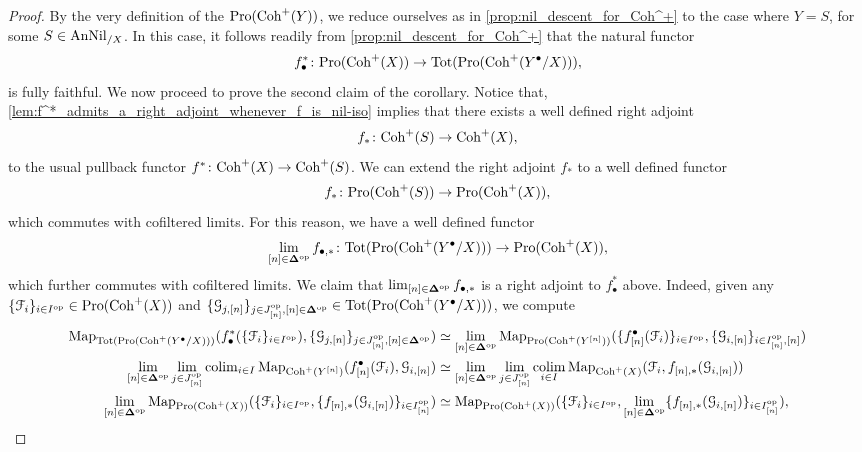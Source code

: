 \documentclass[10pt,a4paper,reqno]{amsart} %
\theoremstyle{plain}
\theoremstyle{definition}
\theoremstyle{remark}
\numberwithin{equation}{section}
\begin{document}
\begin{proof}
    By the very definition of the \infcat $\mathrm{Pro}(\mathrm{Coh}^+(Y))$, we reduce ourselves as in
    \cref{prop:nil_descent_for_Coh^+} to the case where $Y = S$, for some $S \in \mathrm{AnNil}_{/X}$. In this case, it follows readily from
    \cref{prop:nil_descent_for_Coh^+} that the natural functor
        \[
            f_\bullet^* \colon \mathrm{Pro}(\mathrm{Coh}^+(X)) \to \mathrm{Tot}(\mathrm{Pro}(\mathrm{Coh}^+(Y^\bullet/X))),  
        \]
    is fully faithful. We now proceed to prove the second claim of the corollary. Notice that,
    \cref{lem:f^*_admits_a_right_adjoint_whenever_f_is_nil-iso} implies that there exists a well defined right adjoint
        \[
            f_* \colon \mathrm{Coh}^+(S) \to \mathrm{Coh}^+(X),  
        \]
    to the usual pullback functor $f^* \colon \mathrm{Coh}^+(X) \to \mathrm{Coh}^+(S)$. We can extend the right adjoint $f_*$ to a well defined functor
        \[
            f_* \colon \mathrm{Pro}(\mathrm{Coh}^+(S)) \to \mathrm{Pro}(\mathrm{Coh}^+(X)),  
        \]
    which commutes with cofiltered limits. For this reason, we have a well defined functor
        \[
            \lim_{[n] \in \bm{\Delta} ^\mathrm{op}} f_{\bullet, *} \colon \mathrm{Tot}(\mathrm{Pro}(\mathrm{Coh}^+(Y^\bullet/X))) \to \mathrm{Pro}(\mathrm{Coh}^+(X)),  
        \]
    which further commutes with cofiltered limits. We claim that $\lim_{[n] \in \bm{\Delta} ^\mathrm{op}} f_{\bullet, *}$ is a right adjoint to $f_\bullet^*$ above. Indeed, given
    any $\{ \mathcal F_i \}_{i \in I^\mathrm{op}}  \in \mathrm{Pro}(\mathrm{Coh}^+(X))$ and $\{ \mathcal G_{j, [n]} \}_{j \in J_{[n]} ^\mathrm{op}, [n] \in \bm{\Delta} ^\mathrm{op}} \in \mathrm{Tot}(\mathrm{Pro}(\mathrm{Coh}^+(Y^\bullet/X)))$,
    we compute
        \begin{align*}
            \operatorname{Map}_{\mathrm{Tot}(\mathrm{Pro}(\mathrm{Coh}^+(Y^\bullet/X)))}( f_\bullet^*( \{ \mathcal F_i \}_{i \in I^\mathrm{op}}), \{ \mathcal G_{j, [n]} \}_{j \in J^\mathrm{op}_{[n]}, [n] \in \bm{\Delta} ^\mathrm{op}}) & \simeq \lim_{[n] \in \bm{\Delta} ^\mathrm{op}} \operatorname{Map}_{\mathrm{Pro}(\mathrm{Coh}^+(Y^{[n]}))} ( \{f_{[n]}^\bullet(\mathcal F_i) \}_{i \in I^\mathrm{op}},  \{ \mathcal G_{i, [n]} \}_{i \in I^\mathrm{op}_{[n]}, [n]}) \\
            \lim_{[n] \in \bm{\Delta} ^\mathrm{op}} \lim_{j \in J^\mathrm{op}_{[n]}} \mathrm{colim}_{i \in I} \operatorname{Map}_{\mathrm{Coh}^+(Y^{[n]})} ( f_{[n]}^\bullet(\mathcal F_i),   \mathcal G_{i, [n]}) & \simeq \lim_{[n] \in \bm{\Delta} ^\mathrm{op}} \lim_{j \in J^\mathrm{op}_{[n]}} \operatorname*{colim}_{i \in I} \operatorname{Map}_{\mathrm{Coh}^+(X)} (\mathcal F_i, f_{[n], *}(\mathcal G_{i, [n]})) \\
            \lim_{[n] \in \bm{\Delta} ^\mathrm{op}} \operatorname{Map}_{\mathrm{Pro}(\mathrm{Coh}^+(X))}( \{\mathcal F_i\}_{i \in I^\mathrm{op}}, \{f_{[n], *}(\mathcal G_{i, [n]}) \}_{i \in I_{[n]} ^\mathrm{op}}) & \simeq \operatorname{Map}_{\mathrm{Pro}(\mathrm{Coh}^+(X))}( \{\mathcal F_i\}_{i \in I^\mathrm{op}}, \lim_{[n] \in \bm{\Delta} ^\mathrm{op}} \{f_{[n], *}(\mathcal G_{i, [n]}) \}_{i \in I_{[n]} ^\mathrm{op}}),
        \end{align*}

\end{proof}
\end{document}
